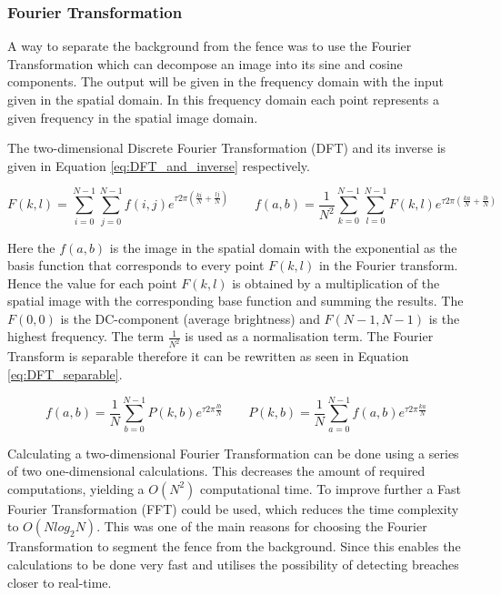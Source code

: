\documentclass[../Head/Main.tex]{subfiles}
\begin{document}
\subsubsection{Fourier Transformation}
\label{seg:fouier_transformation}
A way to separate the background from the fence was to use the Fourier Transformation which can decompose an image into its sine and cosine components. The output will be given in the frequency domain with the input given in the spatial domain. In this frequency domain each point represents a given frequency in the spatial image domain.

The two-dimensional Discrete Fourier Transformation (DFT) and its inverse is given in Equation \ref{eq:DFT_and_inverse} respectively. 

\begin{equation}
    F(k,l) = \sum_{i=0}^{N-1} \sum_{j=0}^{N-1} f(i,j) e^{\tau 2 \pi \left( \frac{ki}{N} + \frac{lj}{N}\right)} \qquad  
        f(a,b) = \frac{1}{N^2} \sum_{k=0}^{N-1} \sum_{l=0}^{N-1} F(k,l) e^{\tau 2 \pi \left( \frac{ka}{N} + \frac{lb}{N} \right)}
    \label{eq:DFT_and_inverse}
\end{equation}

Here the $f(a,b)$ is the image in the spatial domain with the exponential as the basis function that corresponds to every point $F(k,l)$ in the Fourier transform. Hence the value for each point $F(k,l)$ is obtained by a multiplication of the spatial image with the corresponding base function and summing the results. The $F(0,0)$ is the DC-component (average brightness) and $F(N-1,N-1)$ is the highest frequency. The term $\frac{1}{N^2}$ is used as a normalisation term. The Fourier Transform is separable therefore it can be rewritten as seen in Equation \ref{eq:DFT_separable}. 

\begin{equation}
    f(a,b) = \frac{1}{N} \sum_{b=0}^{N-1} P(k,b) e^{\tau 2 \pi \frac{lb}{N}} \qquad
       P(k,b) = \frac{1}{N} \sum_{a=0}^{N-1} f(a,b) e^{\tau 2 \pi \frac{ka}{N}}
    \label{eq:DFT_separable}
\end{equation}

Calculating a two-dimensional Fourier Transformation can be done using a series of two one-dimensional calculations. This decreases the amount of required computations, yielding a $O(N^2)$ computational time. To improve further a Fast Fourier Transformation (FFT) could be used, which reduces the time complexity to $O(N log_2 N)$. This was one of the main reasons for choosing the Fourier Transformation to segment the fence from the background. Since this enables the calculations to be done very fast and utilises the possibility of detecting breaches closer to real-time.\cite{FFT}    
\par
\end{document}
